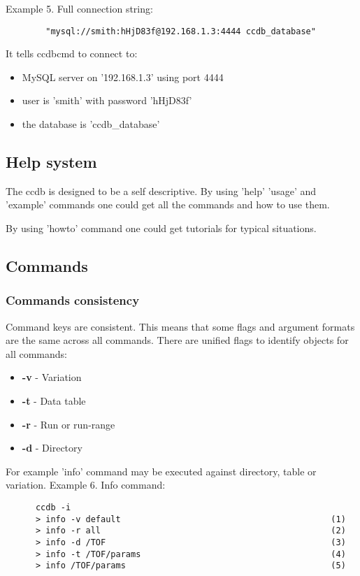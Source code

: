 \documentclass{article}
\begin{document}
Example 5. Full connection string:
\begin{verbatim}	
        "mysql://smith:hHjD83f@192.168.1.3:4444 ccdb_database"
\end{verbatim}

It tells ccdbcmd to connect to:
\begin{itemize}
  \item MySQL server  on '192.168.1.3' using port 4444
  \item user is 'smith' with password 'hHjD83f'
  \item the database is 'ccdb\_database'
\end{itemize}


\subsection{Help system}

The ccdb is designed to be a self descriptive. By using 'help' 'usage' and 'example' commands
one could get all the commands and how to use them.

By using 'howto' command one could get tutorials for typical situations.

\subsection{Commands}

\subsubsection{Commands consistency}

Command keys are consistent. This means that some flags and argument formats
are the same across all commands. There are unified flags to identify objects for all commands:
\begin{itemize}
  \item \textbf{-v} - Variation
  \item \textbf{-t} - Data table
  \item \textbf{-r} - Run or run-range
  \item \textbf{-d} - Directory
\end{itemize}

For example 'info' command may be executed against directory, table or variation.
Example 6. Info command:
\begin{verbatim}
      ccdb -i
      > info -v default                                          (1)
	  > info -r all                                              (2)
	  > info -d /TOF                                             (3)
	  > info -t /TOF/params                                      (4)
	  > info /TOF/params                                         (5)
\end{verbatim}
\end{document}
